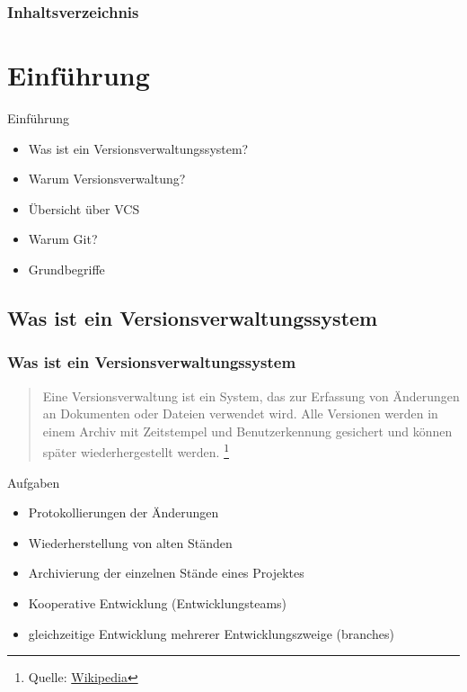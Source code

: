 \documentclass{beamer}
\begin{document}
\begin{frame}
\frametitle{Inhaltsverzeichnis}
\tableofcontents[hidesubsections]
\end{frame}

\section{Einführung} 
\begin{frame}[c]{}
\begin{center}
\begin{Huge}
Einführung
\end{Huge}
\vspace{1.5cm}
\begin{itemize}
\item Was ist ein Versionsverwaltungssystem? 
\item Warum Versionsverwaltung? 
\item Übersicht über VCS 
\item Warum Git?
\item Grundbegriffe
\end{itemize}
\end{center}
\end{frame}

\subsection{Was ist ein Versionsverwaltungssystem}

\begin{frame}\frametitle{Was ist ein Versionsverwaltungssystem} 
\begin{quote}
Eine Versionsverwaltung ist ein System, das zur Erfassung von Änderungen an Dokumenten oder Dateien verwendet wird. Alle Versionen werden in einem Archiv mit Zeitstempel und Benutzerkennung gesichert und können später wiederhergestellt werden.
\footnote{Quelle: \href{http://de.wikipedia.org/wiki/Versionsverwaltung}{Wikipedia}}
\end{quote} 

Aufgaben
\begin{itemize}
\item  Protokollierungen der Änderungen
\item  Wiederherstellung von alten Ständen 
\item  Archivierung der einzelnen Stände eines Projektes
\item  Kooperative Entwicklung (Entwicklungsteams)
\item  gleichzeitige Entwicklung mehrerer Entwicklungszweige (branches)
\end{itemize} 
\end{frame}
\end{document}
